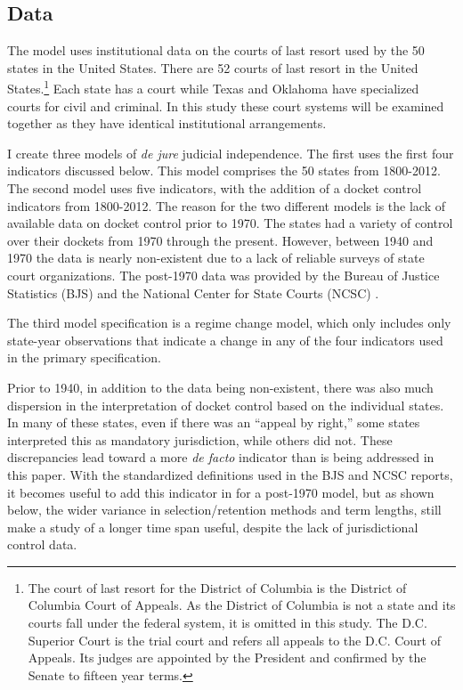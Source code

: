 \documentclass[JohnsonMADraft2.tex]{subfiles}
\begin{document}
\subsection*{Data}
The model uses institutional data on the courts of last resort used by the 50 states in the United States.  There are 52 courts of last resort in the United States.\footnote{The court of last resort for the District of Columbia is the District of Columbia Court of Appeals.  As the District of Columbia is not a state and its courts fall under the federal system, it is omitted in this study.  The D.C. Superior Court is the trial court and refers all appeals to the D.C. Court of Appeals.  Its judges are appointed by the President and confirmed by the Senate to fifteen year terms.}  Each state has a court while Texas and Oklahoma have specialized courts for civil and criminal.  In this study these court systems will be examined together as they have identical institutional arrangements.  

I create three models of \textit{de jure} judicial independence.  The first uses the first four indicators discussed below.  This model comprises the 50 states from 1800-2012.  The second model uses five indicators, with the addition of a docket control indicators from 1800-2012.  The reason for the two different models is the lack of available data on docket control prior to 1970.  The states had a variety of control over their dockets from 1970 through the present.  However, between 1940 and 1970 the data is nearly non-existent due to a lack of reliable surveys of state court organizations.  The post-1970 data was provided by the Bureau of Justice Statistics (BJS) and the National Center for State Courts (NCSC) \citep{BJS1993,BJS1998,BJS2004}.  

The third model specification is a regime change model, which only includes only state-year observations that indicate a change in any of the four indicators used in the primary specification.  

Prior to 1940, in addition to the data being non-existent, there was also much dispersion in the interpretation of docket control based on the individual states.  In many of these states, even if there was an ``appeal by right,'' some states interpreted this as mandatory jurisdiction, while others did not.  These discrepancies lead toward a more \textit{de facto} indicator than is being addressed in this paper.  With the standardized definitions used in the BJS and NCSC reports, it becomes useful to add this indicator in for a post-1970 model, but as shown below, the wider variance in selection/retention methods and term lengths, still make a study of a longer time span useful, despite the lack of jurisdictional control data.  
\end{document}
